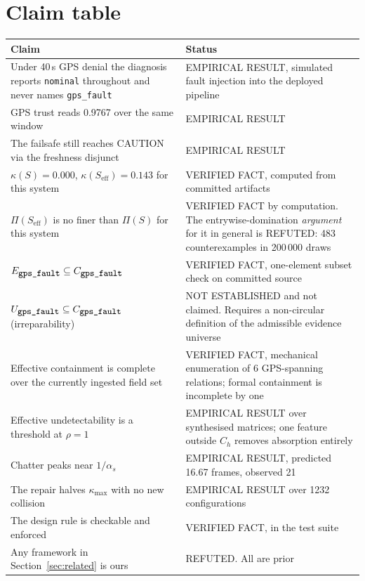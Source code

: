 \documentclass[11pt,a4paper]{article}
\newcommand{\code}[1]{\texttt{\small #1}}
\begin{document}
\section{Claim table}
\label{sec:claims}

\begin{longtable}{p{}p{}}
\toprule
Claim & Status \\
\midrule
\endhead
Under 40\,s GPS denial the diagnosis reports \code{nominal} throughout and
never names \code{gps\_fault} & EMPIRICAL RESULT, simulated fault injection
into the deployed pipeline \\
GPS trust reads 0.9767 over the same window & EMPIRICAL RESULT \\
The failsafe still reaches CAUTION via the freshness disjunct & EMPIRICAL
RESULT \\
$\kappa(S)=0.000$, $\kappa(S_{\mathrm{eff}})=0.143$ for this system & VERIFIED
FACT, computed from committed artifacts \\
$\Pi(S_{\mathrm{eff}})$ is no finer than $\Pi(S)$ for this system & VERIFIED
FACT by computation. The entrywise-domination \emph{argument} for it in general
is REFUTED: 483 counterexamples in 200\,000 draws \\
$E_{\code{gps\_fault}} \subseteq C_{\code{gps\_fault}}$ & VERIFIED FACT,
one-element subset check on committed source \\
$U_{\code{gps\_fault}} \subseteq C_{\code{gps\_fault}}$ (irreparability) & NOT
ESTABLISHED and not claimed. Requires a non-circular definition of the
admissible evidence universe \\
Effective containment is complete over the currently ingested field set &
VERIFIED FACT, mechanical enumeration of 6 GPS-spanning relations; formal
containment is incomplete by one \\
Effective undetectability is a threshold at $\rho=1$ & EMPIRICAL RESULT over
synthesised matrices; one feature outside $C_h$ removes absorption entirely \\
Chatter peaks near $1/\alpha_s$ & EMPIRICAL RESULT, predicted 16.67 frames,
observed 21 \\
The repair halves $\kappa_{\max}$ with no new collision & EMPIRICAL RESULT
over 1232 configurations \\
The design rule is checkable and enforced & VERIFIED FACT, in the test suite \\
Any framework in Section~\ref{sec:related} is ours & REFUTED. All are prior

\end{longtable}
\end{document}
